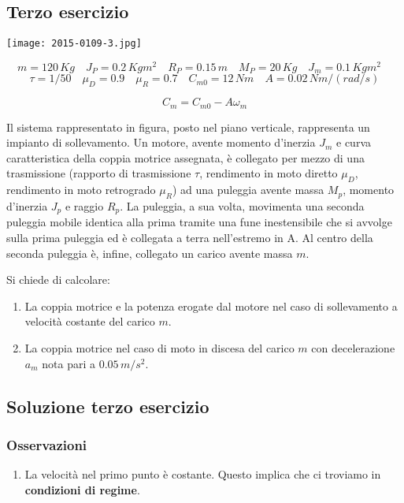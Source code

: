\documentclass[main.tex]{subfiles}
\begin{document}
\subsection{Terzo esercizio}
\texttt{[image: 2015-0109-3.jpg]}

\[
	m =120\,Kg \quad
	J_P = 0.2\,Kgm^2 \quad
	R_P = 0.15\,m \quad
	M_P = 20\, Kg \quad
	J_m = 0.1\,Kgm^2 \quad
\]
\[
	\tau = 1/50 \quad
	\mu_D = 0.9 \quad
	\mu_R = 0.7 \quad
	C_{m0} = 12\,Nm \quad
	A = 0.02\,Nm/(rad/s)
\]

\[
	C_m = C_{m0} - A\omega_m
\]

Il sistema rappresentato in figura, posto nel piano verticale, rappresenta un impianto di sollevamento. Un motore, avente momento d'inerzia $J_m$ e curva caratteristica della coppia motrice assegnata, è collegato per mezzo di una trasmissione (rapporto di trasmissione $\tau$, rendimento in moto diretto $\mu_D$, rendimento in moto retrogrado $\mu_R$) ad una puleggia avente massa $M_p$, momento d'inerzia $J_p$ e raggio $R_p$. La puleggia, a sua volta, movimenta una seconda puleggia mobile identica alla prima tramite una fune inestensibile che si avvolge sulla prima puleggia ed è collegata a terra nell’estremo in A. Al centro della seconda puleggia è, infine, collegato un carico avente massa $m$.

Si chiede di calcolare:

\begin{enumerate}
\item La coppia motrice e la potenza erogate dal motore nel caso di sollevamento a velocità costante del carico $m$.
\item La coppia motrice nel caso di moto in discesa del carico $m$ con decelerazione $a_m$ nota pari a $0.05\,m/s^2$.
\end{enumerate}

\clearpage

\subsection{Soluzione terzo esercizio}

\subsubsection{Osservazioni}

\begin{enumerate}
\item La velocità nel primo punto è costante. Questo implica che ci troviamo in \textbf{condizioni di regime}.
\end{enumerate}
\end{document}
